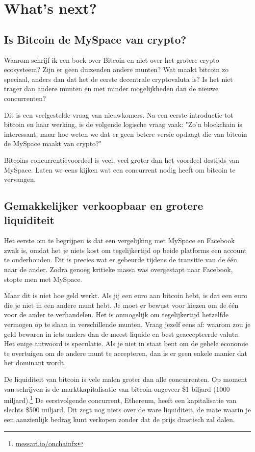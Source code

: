 
\chapter{What's next?}

\section{Is Bitcoin de MySpace van crypto?}

Waarom schrijf ik een boek over Bitcoin en niet over het grotere crypto ecosysteem? Zijn er geen duizenden andere munten? Wat maakt bitcoin zo speciaal, anders dan dat het de eerste decentrale cryptovaluta is? Is het niet trager dan andere munten en met minder mogelijkheden dan de nieuwe concurrenten?

Dit is een veelgestelde vraag van nieuwkomers. Na een eerste introductie tot bitcoin en haar werking, is de volgende logische vraag vaak: "Zo'n blockchain is interessant, maar hoe weten we dat er geen betere versie opdaagt die van bitcoin de MySpace maakt van crypto?"

Bitcoins concurrentievoordeel is veel, veel groter dan het voordeel destijds van MySpace. Laten we eens kijken wat een concurrent nodig heeft om bitcoin te vervangen.

\section{Gemakkelijker verkoopbaar en grotere liquiditeit}

Het eerste om te begrijpen is dat een vergelijking met MySpace en Facebook zwak is, omdat het je niets kost om tegelijkertijd op beide platforms een account te onderhouden. Dit is precies wat er gebeurde tijdens de transitie van de één naar de ander. Zodra genoeg kritieke massa was overgestapt naar Facebook, stopte men met MySpace.

Maar dit is niet hoe geld werkt. Als jij een euro aan bitcoin hebt, is dat een euro die je niet in een andere munt hebt. Je moet er bewust voor kiezen om de één voor de ander te verhandelen. Het is onmogelijk om tegelijkertijd hetzelfde vermogen op te slaan in verschillende munten. Vraag jezelf eens af: waarom zou je geld bewaren in iets anders dan de meest liquide en best geaccepteerde valuta. Het enige antwoord is speculatie. Als je niet in staat bent om de gehele economie te overtuigen om de andere munt te accepteren, dan is er geen enkele manier dat het dominant wordt. 

De liquiditeit van bitcoin is vele malen groter dan alle concurrenten. Op moment van schrijven is de marktkapitalisatie van bitcoin ongeveer \$1 biljard (1000 miljard).\footnote{\href{https://messari.io/onchainfx}{messari.io/onchainfx}} De eerstvolgende concurrent, Ethereum, heeft een kapitalisatie van slechts \$500 miljard. Dit zegt nog niets over de ware liquiditeit, de mate waarin je een aanzienlijk bedrag kunt verkopen zonder dat de prijs drastisch zal dalen. 

